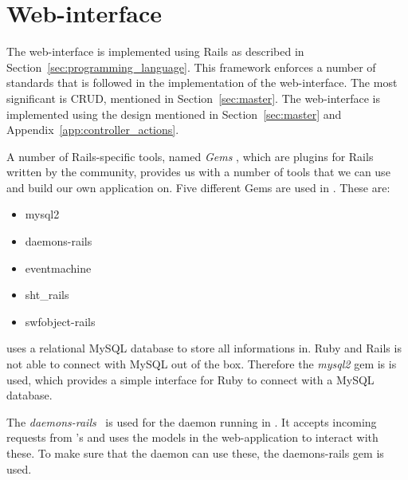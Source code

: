 

\section{Web-interface}
The web-interface is implemented using Rails as described in Section~\ref{sec:programming_language}.
This framework enforces a number of standards that is followed in the implementation of the web-interface.
The most significant is CRUD, mentioned in Section~\ref{sec:master}.
The web-interface is implemented using the design mentioned in Section~\ref{sec:master} and Appendix~\ref{app:controller_actions}.

A number of Rails-specific tools, named \emph{Gems} \citep{Rails_Gems}, which are plugins for Rails written by the community, provides us with a number of tools that we can use and build our own application on. 
Five different Gems are used in \projectname{}. 
These are: \\

\begin{itemize}
	\item mysql2
	\item daemons-rails
	\item eventmachine
	\item sht\_rails
	\item swfobject-rails
\end{itemize}

\projectname{} uses a relational MySQL database to store all informations in.
Ruby and Rails is not able to connect with MySQL out of the box. 
Therefore the \emph{mysql2} \citep{Rails_mysql2} gem is is used, which provides a simple interface for Ruby to connect with a MySQL database.

The \emph{daemons-rails} \citep{Rails_daemons_rails} is used for the daemon running in . 
It accepts incoming requests from 's and uses the models in the web-application to interact with these.
To make sure that the daemon can use these, the daemons-rails gem is used.

